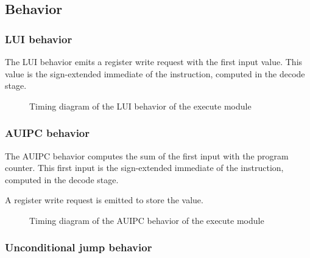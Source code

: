       \begin{table}[H]
          \centering
          
          \caption{}
          \label{tab:exm-branch-output}
        \end{table}

  \subsection{Behavior}

    \subsubsection{LUI behavior}

      \begin{content}
          The LUI behavior emits a register write request with the first input value. This value is the sign-extended immediate of the instruction, computed in the decode stage.
        \end{content}

      \begin{figure}[H]
          \centering
          
          \caption{Timing diagram of the LUI behavior of the execute module}
          \label{fig:exm-behavior-lui}
        \end{figure}

    \subsubsection{AUIPC behavior}

      \begin{content}
          The AUIPC behavior computes the sum of the first input with the program counter. This first input is the sign-extended immediate of the instruction, computed in the decode stage.
          
          A register write request is emitted to store the value.
        \end{content}

      \begin{figure}[H]
          \centering
          
          \caption{Timing diagram of the AUIPC behavior of the execute module}
          \label{fig:exm-behavior-auipc}
        \end{figure}

    \subsubsection{Unconditional jump behavior}

